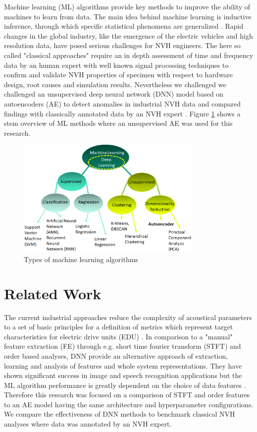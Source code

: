 \documentclass[a4paper, 10pt, twocolumn]{article}
\begin{document}
Machine learning (ML) algorithms provide key methods to improve the ability of machines to learn from data. The main idea behind machine learning is inductive inference, through which specific statistical phenomena are generalized \cite{b2}. Rapid changes in the global industry, like the emergence of the electric vehicles and high resolution data, have posed serious challenges for NVH engineers. The here so called "classical approaches" require an in depth assessment of time and frequency data by an human expert with well known signal processing techniques to conﬁrm and validate NVH properties of specimen with respect to hardware design, root causes and simulation results. Nevertheless we challenged we challenged an unsupervised deep neural network (DNN) model based on autoencoders (AE) to detect anomalies in industrial NVH data and compared findings with classically annotated data by an NVH expert \cite{b3}. 
Figure \ref{fig:types_of_ml} shows a stem overview of ML methods where an unsupervised AE was used for this research.  

\begin{figure}[hbt]
    \begin{center}
        \includegraphics[width=9cm]{ml_types.eps}
    \end{center}
    \caption{Types of machine learning algorithms}
    \label{fig:types_of_ml}
\end{figure}

\section*{Related Work}
\label{sec:Related Work}
The current industrial approaches reduce the complexity of acoustical parameters to a set of basic principles for a definition of metrics which represent target characteristics for electric drive units (EDU) \cite{b4}. In comparison to a "manual" feature extraction (FE) through e.g. short time fourier transform (STFT) and order based analyses, DNN provide an alternative approach of extraction, learning and analysis of features and whole system representations. They have shown significant success in image and speech recognition applications but the ML algorithm performance is greatly dependent on the choice of data features \cite{b1}. Therefore this research was focused on a comparison of STFT and order features to an AE model having the same architecture and hyperparameter configurations. We compare the effectiveness of DNN methods to benchmark classical NVH analyses where data was annotated by an NVH expert.  
\end{document}

